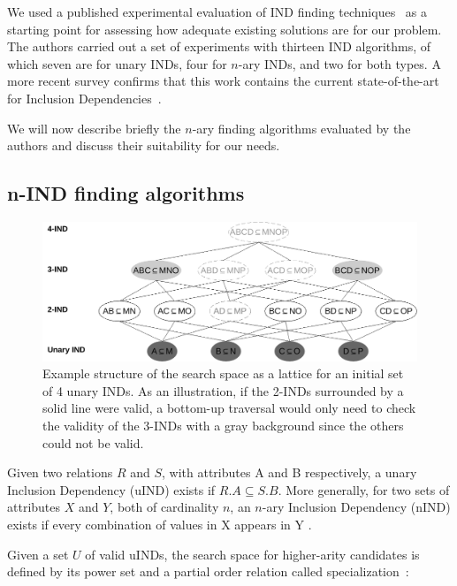 We used a published experimental evaluation of \gls{IND} finding techniques~\cite{Dursch2019} as a starting point for
assessing how adequate existing solutions are for our problem. The authors carried out a
set of experiments with thirteen \gls{IND} algorithms, of which seven are for unary \glspl{IND},
four for $n$-ary \glspl{IND}, and two for both types. A more recent survey confirms that this
work contains the current state-of-the-art for Inclusion
Dependencies~\cite{kossmann_data_2022}.

We will now describe briefly the $n$-ary finding
algorithms evaluated by the authors and discuss their suitability for our needs.

\subsection{n-IND finding algorithms}
\label{sec:nind_finding}
\begin{figure}[ht]
    \centering
    \includegraphics[width=\linewidth]{images/5_presq/lattice}
    \caption[Example structure of the search space as a lattice for an initial set
        of 4 unary .]{
        Example structure of the search space as a lattice for an initial set
        of 4 unary \glspl{IND}.
        As an illustration, if the 2-INDs surrounded by a solid line were valid,
        a bottom-up traversal would only need to check the validity of the 3-INDs with a 
        gray background since the others could not be valid.
    }
    \label{fig:lattice}
\end{figure}

Given two relations $R$ and $S$, with attributes A and B respectively,
a unary Inclusion Dependency (uIND) exists if $R.A \subseteq S.B$.
More generally, for two sets of attributes $X$ and $Y$, both of cardinality $n$, an
$n$-ary Inclusion Dependency (nIND) exists if every combination of values in X appears in Y
\cite{DeMarchi2002,abedjan2015}.

Given a set $U$ of valid uINDs, the search space for
higher-arity candidates is defined by its power set and a partial order relation
called specialization~\cite{DeMarchi2002}:

